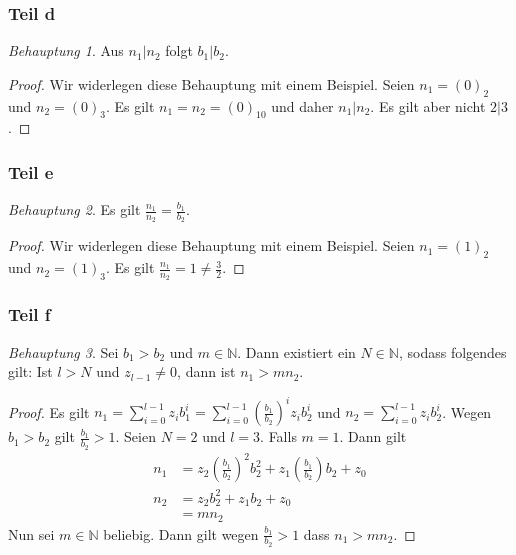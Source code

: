 \documentclass[a5paper]{article}
\theoremstyle{remark}
\newtheorem*{Behauptung}{Behauptung}
\begin{document}
\subsubsection{Teil d}
\begin{Behauptung}
  Aus \(n_1|n_2\) folgt \(b_1|b_2\).
\end{Behauptung}
\begin{proof}
  Wir widerlegen diese Behauptung mit einem Beispiel.  Seien \(n_1=(0)_2\)
  und \(n_2=(0)_3\).  Es gilt \(n_1=n_2=(0)_{10}\) und daher \(n_1|n_2\).  Es
  gilt aber nicht \(2|3\).
\end{proof}
\subsubsection{Teil e}
\begin{Behauptung}
  Es gilt \(\frac{n_1}{n_2}=\frac{b_1}{b_2}\).
\end{Behauptung}
\begin{proof}
  Wir widerlegen diese Behauptung mit einem Beispiel.  Seien \(n_1=(1)_2\)
  und \(n_2=(1)_3\).  Es gilt \(\frac{n_1}{n_2}=1\neq \frac{3}{2}\).
\end{proof}
\subsubsection{Teil f}
\begin{Behauptung}
  Sei \(b_1 > b_2\) und \(m \in \mathbb{N}\).  Dann
  existiert ein \(N \in \mathbb{N}\), sodass folgendes gilt:  Ist \(l > N\)
  und \(z_{l-1}\neq 0\), dann ist \(n_1 > mn_2\).
\end{Behauptung}
\begin{proof}
  Es gilt
  $n_1=\sum_{i=0}^{l-1}{z_ib_1^i}=\sum_{i=0}^{l-1}{ \left( \frac{b_1}{b_2}
    \right)^iz_i b_2^i}$ und \(n_2=\sum_{i=0}^{l-1}{z_ib_2^i}\).  Wegen
  \(b_1>b_2\) gilt \(\frac{b_1}{b_2}>1\).  Seien \(N=2\) und \(l=3\).  Falls
  \(m = 1\).  Dann gilt
  \begin{align*}
    n_1&=z_2\left(\frac{b_1}{b_2} \right)^2 b_2^2 +
         z_1\left(\frac{b_1}{b_2} \right) b_2 + z_0\\
    n_2&=z_2 b_2^2 + z_1 b_2 + z_0\\
       &=mn_2
  \end{align*}
  Nun sei \(m \in \mathbb{N}\) beliebig.  Dann gilt wegen
  \(\frac{b_1}{b_2}>1\) dass \(n_1>mn_2\).
\end{proof}
\end{document}
